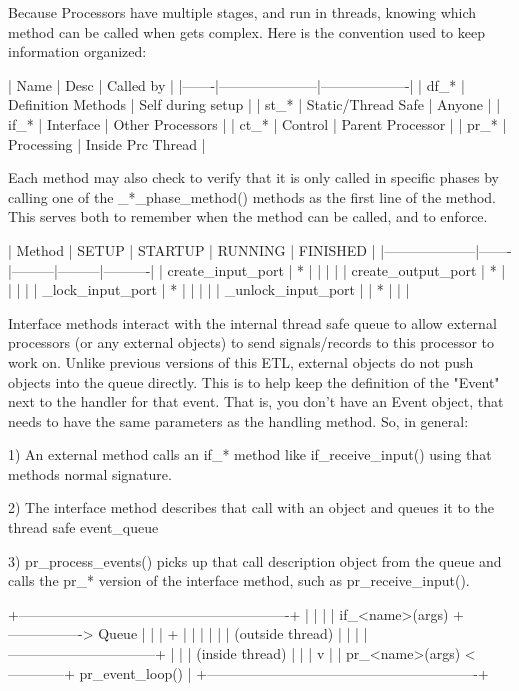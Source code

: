 \begin{DoxyVerb}
Because Processors have multiple stages, and run in threads, knowing
which method can be called when gets complex.  Here is the convention
used to keep information organized:

| Name  |       Desc          |   Called by       |
|-------|---------------------|-------------------|
| df_*  | Definition Methods  | Self during setup |
| st_*  | Static/Thread Safe  | Anyone            |
| if_*  | Interface           | Other Processors  |
| ct_*  | Control             | Parent Processor  |
| pr_*  | Processing          | Inside Prc Thread |

Each method may also check to verify that it is only called in specific
phases by calling one of the _*_phase_method() methods as the first line
of the method.  This serves both to remember when the method can be
called, and to enforce.


|       Method       | SETUP | STARTUP | RUNNING | FINISHED |
|--------------------|-------|---------|---------|----------|
| create_input_port  |   *   |         |         |          |
| create_output_port |   *   |         |         |          |
| _lock_input_port   |   *   |         |         |          |
| _unlock_input_port |       |   *     |         |          |


Interface methods interact with the internal thread safe queue to allow
external processors (or any external objects) to send signals/records to
this processor to work on.  Unlike previous versions of this ETL, external
objects do not push objects into the queue directly.  This is to help
keep the definition of the "Event" next to the handler for that event.
That is, you don't have an Event object, that needs to have the same
parameters as the handling method.  So, in general:

1) An external method calls an if_* method like if_receive_input()
   using that methods normal signature.

2) The interface method describes that call with an object and 
   queues it to the thread safe event_queue
   
3) pr_process_events() picks up that call description object from
   the queue and calls the pr_* version of the interface method,
   such as pr_receive_input().

    +----------------------------------------------------------+    
    |                                |                         |    
    |           if_<name>(args) +----------------> Queue       |    
    |                                |               +         |
    |                                |               |         |    
    | (outside thread)               |               |         |    
    |--------------------------------+               |         |    
    | (inside thread)                                |         |    
    |                                                v         |    
    |           pr_<name>(args) <------------+ pr_event_loop() |
    +----------------------------------------------------------+
            


\end{DoxyVerb}
